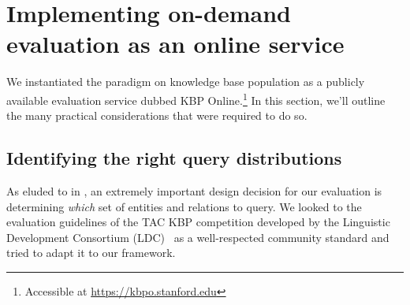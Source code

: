 \section{\label{sec:kbpo:kbpo} Implementing on-demand evaluation as an online service}



We instantiated the paradigm on knowledge base population as a publicly available evaluation service dubbed KBP Online.\footnote{Accessible at \url{https://kbpo.stanford.edu}}
In this section, we'll outline the many practical considerations that were required to do so.

\subsection{Identifying the right query distributions}
As eluded to in , an extremely important design decision for our evaluation is determining \textit{which} set of entities and relations to query.
We looked to the evaluation guidelines of the TAC KBP competition developed by the Linguistic Development Consortium (LDC)~\citep{ellis2015tackbp,mayfield2012evaluating} as a well-respected community standard and tried to adapt it to our framework.

